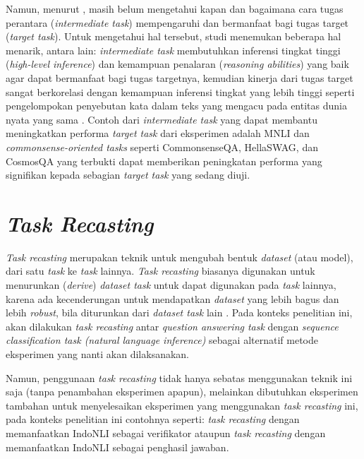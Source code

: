 Namun, menurut \citet{pruksachatkun-etal-2020-intermediate}, masih belum mengetahui kapan dan bagaimana cara tugas perantara (\emph{intermediate task}) mempengaruhi dan bermanfaat bagi tugas target (\emph{target task}). Untuk mengetahui hal tersebut, studi \citet{pruksachatkun-etal-2020-intermediate} menemukan beberapa hal menarik, antara lain: \emph{intermediate task} membutuhkan inferensi tingkat tinggi (\emph{high-level inference}) dan kemampuan penalaran (\emph{reasoning abilities}) yang baik agar dapat bermanfaat bagi tugas targetnya, kemudian kinerja dari tugas target sangat berkorelasi dengan kemampuan inferensi tingkat yang lebih tinggi seperti pengelompokan penyebutan kata dalam teks yang mengacu pada entitas dunia nyata yang sama \citep{coference-resolution}. Contoh dari \emph{intermediate task} yang dapat membantu meningkatkan performa \emph{target task} dari eksperimen \citeauthor{pruksachatkun-etal-2020-intermediate} adalah MNLI dan \emph{commonsense-oriented tasks} seperti CommonsenseQA, HellaSWAG, dan CosmosQA yang terbukti dapat memberikan peningkatan performa yang signifikan kepada sebagian \emph{target task} yang sedang diuji.

\section{\emph{Task Recasting}}
\emph{Task recasting} merupakan teknik untuk mengubah bentuk \emph{dataset} (atau model), dari satu \emph{task} ke \emph{task} lainnya. \emph{Task recasting} biasanya digunakan untuk menurunkan (\emph{derive}) \emph{dataset task} untuk dapat digunakan pada \emph{task} lainnya, karena ada kecenderungan untuk mendapatkan \emph{dataset} yang lebih bagus dan lebih \emph{robust}, bila diturunkan dari \emph{dataset task} lain \citep{DBLP:journals/corr/abs-1809-02922}. Pada konteks penelitian ini, akan dilakukan \emph{task recasting} antar \emph{question answering task} dengan \emph{sequence classification task (natural language inference)} sebagai alternatif metode eksperimen yang nanti akan dilaksanakan.

Namun, penggunaan \emph{task recasting} tidak hanya sebatas menggunakan teknik ini saja (tanpa penambahan eksperimen apapun), melainkan dibutuhkan eksperimen tambahan untuk menyelesaikan eksperimen yang menggunakan \emph{task recasting} ini, pada konteks penelitian ini contohnya seperti: \emph{task recasting} dengan memanfaatkan IndoNLI sebagai verifikator ataupun \emph{task recasting} dengan memanfaatkan IndoNLI sebagai penghasil jawaban.


